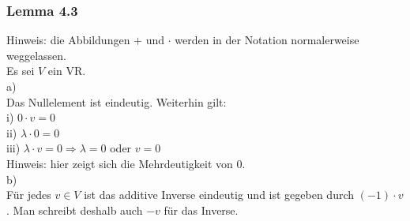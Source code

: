 \documentclass{article}
\begin{document}
\subsubsection*{Lemma 4.3}
Hinweis: die Abbildungen $+$ und $\cdot$ werden in der Notation normalerweise weggelassen. \\
Es sei $V$ ein VR. \\
a) \\
Das Nullelement ist eindeutig. Weiterhin gilt: \\
i) $0 \cdot v = 0$ \\
ii) $\lambda \cdot 0 = 0$ \\
iii) $\lambda \cdot v = 0 \Rightarrow \lambda = 0$ oder $v = 0$ \\
Hinweis: hier zeigt sich die Mehrdeutigkeit von 0. \\
b) \\
Für jedes $v \in V$ ist das additive Inverse eindeutig und ist gegeben durch $(-1) \cdot v$. Man schreibt deshalb auch $-v$ für das Inverse. \\
\\
\end{document}
